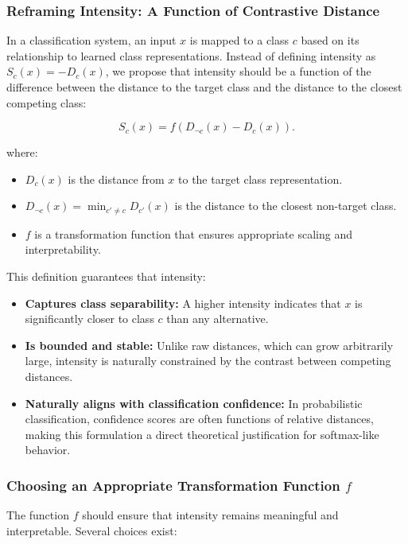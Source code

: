 \documentclass[12pt]{article}
\begin{document}
\subsubsection{Reframing Intensity: A Function of Contrastive Distance}

In a classification system, an input \( x \) is mapped to a class \( c \) based on its relationship to learned class representations. Instead of defining intensity as \( S_c(x) = -D_c(x) \), we propose that intensity should be a function of the difference between the distance to the target class and the distance to the closest competing class:

\[
S_c(x) = f(D_{\neg c}(x) - D_c(x)).
\]

where:

\begin{itemize}
    \item \( D_c(x) \) is the distance from \( x \) to the target class representation.
    \item \( D_{\neg c}(x) = \min_{c' \neq c} D_{c'}(x) \) is the distance to the closest non-target class.
    \item \( f \) is a transformation function that ensures appropriate scaling and interpretability.
\end{itemize}

This definition guarantees that intensity:

\begin{itemize}
    \item \textbf{Captures class separability:} A higher intensity indicates that \( x \) is significantly closer to class \( c \) than any alternative.
    \item \textbf{Is bounded and stable:} Unlike raw distances, which can grow arbitrarily large, intensity is naturally constrained by the contrast between competing distances.
    \item \textbf{Naturally aligns with classification confidence:} In probabilistic classification, confidence scores are often functions of relative distances, making this formulation a direct theoretical justification for softmax-like behavior.
\end{itemize}

\subsubsection{Choosing an Appropriate Transformation Function \( f \)}

The function \( f \) should ensure that intensity remains meaningful and interpretable. Several choices exist:
\end{document}
